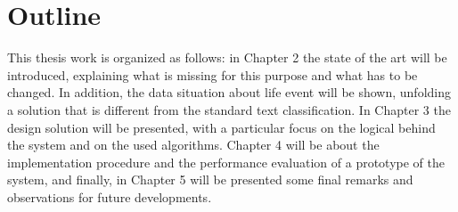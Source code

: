 \section{Outline}

This thesis work is organized as follows: in Chapter 2 the state of the art will be introduced, explaining what is missing for this purpose and what has to be changed. In addition, the data situation about life event will be shown, unfolding a solution that is different from the standard text classification. In Chapter 3 the design solution will be presented, with a particular focus on the logical behind the system and on the used algorithms. Chapter 4 will be about the implementation procedure and the performance evaluation of a prototype of the system, and finally, in Chapter 5 will be presented some final remarks and observations for future developments.

